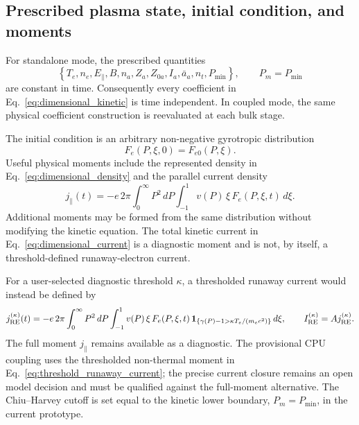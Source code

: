 \documentclass[11pt]{article}
\begin{document}
\subsection{Prescribed plasma state, initial condition, and moments}

For standalone mode, the prescribed quantities
\begin{equation}
 \left\{T_e,n_e,E_\parallel,B,n_a,Z_a,Z_{0a},I_a,\bar a_a,n_t,P_{\min}\right\},
 \qquad P_m=P_{\min}
\end{equation}
are constant in time.  Consequently every coefficient in
Eq.~\eqref{eq:dimensional_kinetic} is time independent.  In coupled mode, the same
physical coefficient construction is reevaluated at each bulk stage.

The initial condition is an arbitrary non-negative gyrotropic distribution
\begin{equation}
 F_e(P,\xi,0)=F_{e0}(P,\xi).
 \label{eq:dimensional_initial_condition}
\end{equation}
Useful physical moments include the represented density in
Eq.~\eqref{eq:dimensional_density} and the parallel current density
\begin{equation}
 j_\parallel(t)
 =-e\,2\pi\int_0^\infty P^2\,dP\int_{-1}^{1}
  v(P)\,\xi\,F_e(P,\xi,t)\,d\xi.
 \label{eq:dimensional_current}
\end{equation}
Additional moments may be formed from the same distribution without modifying the
kinetic equation.  The total kinetic current in Eq.~\eqref{eq:dimensional_current}
is a diagnostic moment and is not, by itself, a threshold-defined runaway-electron
current.

For a user-selected diagnostic threshold $\kappa$, a thresholded runaway current
would instead be defined by
\begin{equation}
 j_{\rm RE}^{(\kappa)}(t)
 =-e\,2\pi\int_0^\infty P^2\,dP\int_{-1}^{1}
 v(P)\,\xi\,F_e(P,\xi,t)\,
 \mathbf 1_{\{\gamma(P)-1>\kappa T_e/(m_ec^2)\}}\,d\xi,
 \qquad
 I_{\rm RE}^{(\kappa)}=A j_{\rm RE}^{(\kappa)}.
 \label{eq:threshold_runaway_current}
\end{equation}
The full moment $j_\parallel$ remains available as a diagnostic.  The provisional
CPU coupling uses the thresholded non-thermal moment in
Eq.~\eqref{eq:threshold_runaway_current}; the precise current closure remains an
open model decision and must be qualified against the full-moment alternative.  The
Chiu--Harvey cutoff is set equal to the kinetic lower boundary,
$P_m=P_{\min}$, in the current prototype.
\end{document}
